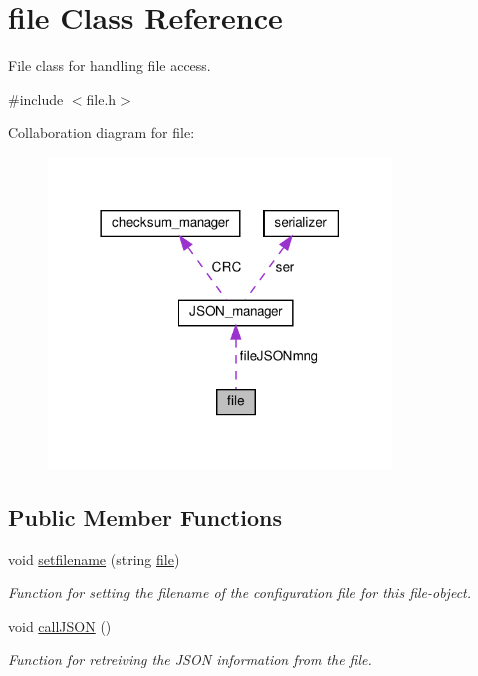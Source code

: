 \hypertarget{classfile}{}\section{file Class Reference}
\label{classfile}


File class for handling file access.  




{\ttfamily \#include $<$file.\+h$>$}



Collaboration diagram for file\+:
\nopagebreak
\begin{figure}[H]
\begin{center}
\leavevmode
\includegraphics[width=258pt]{classfile__coll__graph}
\end{center}
\end{figure}
\subsection*{Public Member Functions}
\begin{DoxyCompactItemize}
\item 
void \hyperlink{classfile_a04d228a8eabeb75ed6f6f7c87f5053db}{setfilename} (string \hyperlink{classfile}{file})
\begin{DoxyCompactList}\small\item\em Function for setting the filename of the configuration file for this file-\/object. \end{DoxyCompactList}\item 
void \hyperlink{classfile_a6f3aeac1f4b08cd52b7879ea999fded1}{call\+J\+S\+ON} ()
\begin{DoxyCompactList}\small\item\em Function for retreiving the J\+S\+ON information from the file. \end{DoxyCompactList}\end{DoxyCompactItemize}
